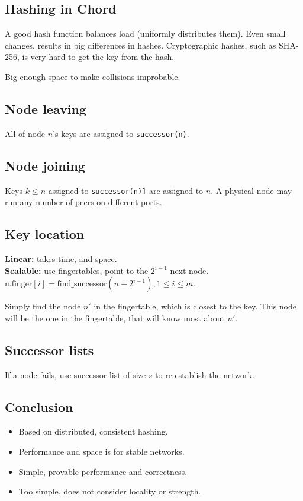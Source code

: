 	\subsection{Hashing in Chord}
	A good hash function balances load (uniformly distributes them). Even small changes, results in big differences in hashes. Cryptographic hashes, such as SHA-256, is very hard to get the key from the hash. 
	
	Big enough space to make collisions improbable.
	
	\subsection{Node leaving}
	All of node $n$'s keys are assigned to \texttt{successor(n)}.
	
	\subsection{Node joining}
	Keys $k \leq n$ assigned to \texttt{successor(n)]} are assigned to $n$. A physical node may run any number of peers on different ports.
	
	\subsection{Key location}
	\textbf{Linear:} takes  time, and  space.
	\\
	\textbf{Scalable:} use fingertables, point to the $2^{i-1}$ next node. $\text{n.finger}[i] = \text{find\_successor}(n+2^{i-1}), 1 \leq i \leq m$.
	
	Simply find the node $n'$ in the fingertable, which is closest to the key. This node will be the one in the fingertable, that will know most about $n'$.
	
	\subsection{Successor lists}
	If a node fails, use successor list of size $s$ to re-establish the network.
	
	\subsection{Conclusion}
	\begin{itemize}
		\item Based on distributed, consistent hashing.
		\item Performance and space is  for stable networks.
		\item Simple, provable performance and correctness.
		\item Too simple, does not consider locality or strength.
	\end{itemize}
	
